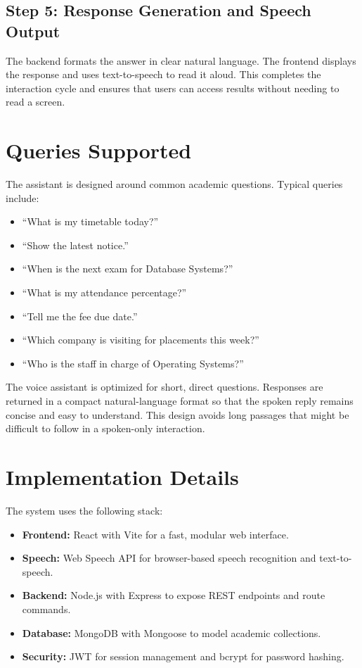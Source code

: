 ﻿\documentclass[conference]{IEEEtran}
\begin{document}
\subsection{Step 5: Response Generation and Speech Output}
The backend formats the answer in clear natural language. The frontend displays the response and uses text-to-speech to read it aloud. This completes the interaction cycle and ensures that users can access results without needing to read a screen.

\section{Queries Supported}
The assistant is designed around common academic questions. Typical queries include:
\begin{itemize}[leftmargin=*]
\item ``What is my timetable today?''
\item ``Show the latest notice.''
\item ``When is the next exam for Database Systems?''
\item ``What is my attendance percentage?''
\item ``Tell me the fee due date.''
\item ``Which company is visiting for placements this week?''
\item ``Who is the staff in charge of Operating Systems?''
\end{itemize}

The voice assistant is optimized for short, direct questions. Responses are returned in a compact natural-language format so that the spoken reply remains concise and easy to understand. This design avoids long passages that might be difficult to follow in a spoken-only interaction.

\section{Implementation Details}
The system uses the following stack:
\begin{itemize}[leftmargin=*]
\item \textbf{Frontend:} React with Vite for a fast, modular web interface.
\item \textbf{Speech:} Web Speech API for browser-based speech recognition and text-to-speech.
\item \textbf{Backend:} Node.js with Express to expose REST endpoints and route commands.
\item \textbf{Database:} MongoDB with Mongoose to model academic collections.
\item \textbf{Security:} JWT for session management and bcrypt for password hashing.
\end{itemize}
\end{document}
